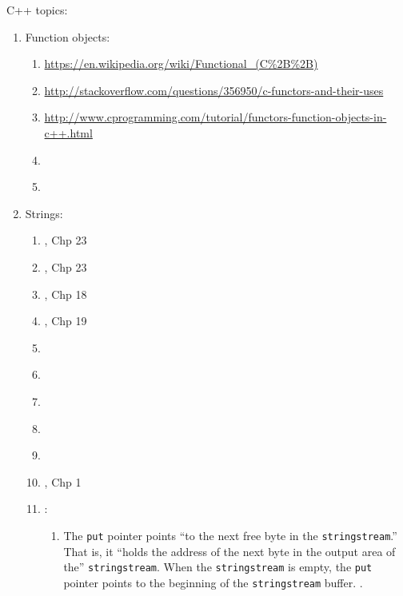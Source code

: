 C++ topics: \vspace{-0.3cm}
\begin{enumerate} \itemsep -4pt
\item Function objects: \vspace{-0.3cm}
	\begin{enumerate} \itemsep -2pt
	\item \url{https://en.wikipedia.org/wiki/Functional_(C%2B%2B)}
	\item \url{http://stackoverflow.com/questions/356950/c-functors-and-their-uses}
	\item \url{http://www.cprogramming.com/tutorial/functors-function-objects-in-c++.html}
	\item \cite[pp. 233--243]{Josuttis2012}
	\item \cite[pp. 327--332, 885, 922--929, 931, 947]{Prata2005}
	\end{enumerate}
\item Strings: \vspace{-0.3cm}
	\begin{enumerate} \itemsep -2pt
	\item \cite{Stroustrup2014}, Chp 23
	\item \cite{Stroustrup2009}, Chp 23
	\item \cite{Gregoire2014}, Chp 18
	\item \cite{Allain2012}, Chp 19
	\item \cite[pp. 56--60, string data types, variable vs. literal; strings and string class, 13, 82--87, 320--324, 363--365, 496]{Horstmann2012}
	\item \cite[655--716]{Josuttis2012}
	\item \cite[pp. 64--67, 320--325, 465--482]{Savitch2009}
	\item \cite[\S14.2]{Scheinerman2006}
	\item \cite[pp. 114--131]{Prata2005}
	\item \cite{Eckel2003}, Chp 1
	\item \cite{Heller2003}: \vspace{-0.2cm}
		\begin{enumerate} \itemsep -2pt
		\item The {\tt put} pointer points ``to the next free byte in the {\tt stringstream}.'' That is, it ``holds the address of the next byte in the output area of the'' {\tt stringstream}. When the {\tt stringstream} is empty, the {\tt put} pointer points to the beginning of the {\tt stringstream} buffer. \cite[\S9.8]{Heller2003}.

\end{enumerate}
\end{enumerate}
\end{enumerate}
